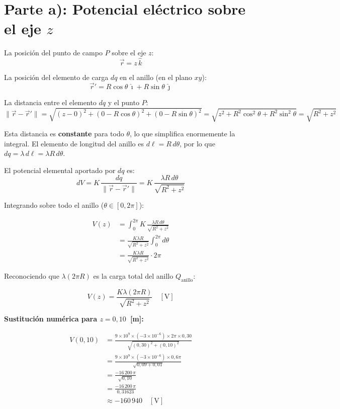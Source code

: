 \documentclass[12pt,letterpaper]{article}
\begin{document}
\section*{Parte a): Potencial el\'ectrico sobre el eje $z$}

La posici\'on del punto de campo $P$ sobre el eje $z$:
\[
    \vec{r} = z\,\hat{k}
\]

La posici\'on del elemento de carga $dq$ en el anillo (en el plano $xy$):
\[
    \vec{r}' = R\cos\theta\,\hat{\imath} + R\sin\theta\,\hat{\jmath}
\]

La distancia entre el elemento $dq$ y el punto $P$:
\[
    \|\vec{r} - \vec{r}'\|
    = \sqrt{(z - 0)^2 + (0 - R\cos\theta)^2 + (0 - R\sin\theta)^2}
    = \sqrt{z^2 + R^2\cos^2\theta + R^2\sin^2\theta}
    = \sqrt{R^2 + z^2}
\]

Esta distancia es \textbf{constante} para todo $\theta$, lo que simplifica enormemente la
integral. El elemento de longitud del anillo es $d\ell = R\,d\theta$, por lo que
$dq = \lambda\,d\ell = \lambda R\,d\theta$.

El potencial elemental aportado por $dq$ es:
\[
    dV = K\,\frac{dq}{\|\vec{r}-\vec{r}'\|}
       = K\,\frac{\lambda R\,d\theta}{\sqrt{R^2 + z^2}}
\]

Integrando sobre todo el anillo ($\theta \in [0, 2\pi]$):

\begin{align*}
    V(z) &= \int_0^{2\pi} K\,\frac{\lambda R\,d\theta}{\sqrt{R^2 + z^2}} \\[6pt]
         &= \frac{K\lambda R}{\sqrt{R^2 + z^2}} \int_0^{2\pi} d\theta \\[6pt]
         &= \frac{K\lambda R}{\sqrt{R^2 + z^2}} \cdot 2\pi
\end{align*}

Reconociendo que $\lambda(2\pi R)$ es la carga total del anillo $Q_\text{anillo}$:

\[
    \boxed{V(z) = \frac{K\lambda(2\pi R)}{\sqrt{R^2 + z^2}} \quad [\text{V}]}
\]

\bigskip

\noindent\textbf{Sustituci\'on num\'erica para $z = 0{,}10$~[m]:}

\begin{align*}
    V(0{,}10) &= \frac{9\times10^9 \times (-3\times10^{-6}) \times 2\pi \times 0{,}30}
                      {\sqrt{(0{,}30)^2 + (0{,}10)^2}} \\[8pt]
              &= \frac{9\times10^9 \times (-3\times10^{-6}) \times 0{,}6\pi}
                      {\sqrt{0{,}09 + 0{,}01}} \\[8pt]
              &= \frac{-16\,200\,\pi}{\sqrt{0{,}10}} \\[8pt]
              &= \frac{-16\,200\,\pi}{0{,}31623} \\[8pt]
              &\approx -160\,940 \quad [\text{V}]
\end{align*}
\end{document}
